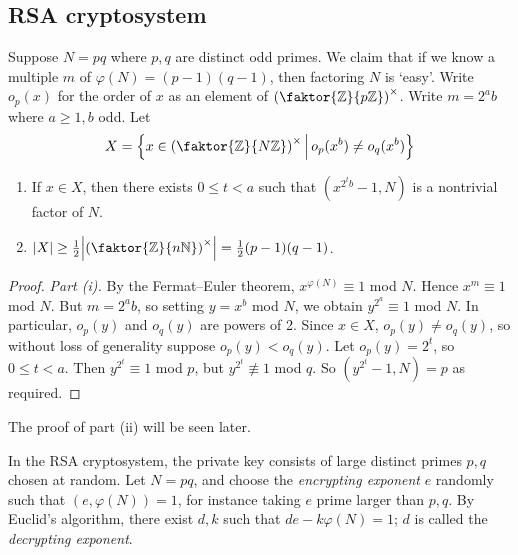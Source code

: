 \subsection{RSA cryptosystem}
Suppose \( N = pq \) where \( p, q \) are distinct odd primes.
We claim that if we know a multiple \( m \) of \( \varphi(N) = (p-1)(q-1) \), then factoring \( N \) is `easy'.
Write \( o_p(x) \) for the order of \( x \) as an element of \( \qty(\faktor{\mathbb Z}{p\mathbb Z})^\times \).
Write \( m = 2^a b \) where \( a \geq 1, b \) odd.
Let
\[ X = \qty{x \in \qty(\faktor{\mathbb Z}{N\mathbb Z})^\times \midd o_p(x^b) \neq o_q(x^b)} \]
\begin{theorem}
    \begin{enumerate}
        \item If \( x \in X \), then there exists \( 0 \leq t < a \) such that \( (x^{2^t b} - 1, N) \) is a nontrivial factor of \( N \).
        \item \( \abs{X} \geq \frac{1}{2} \abs{\qty(\faktor{\mathbb Z}{n\mathbb N})^\times} = \frac{1}{2}(p-1)(q-1) \).
    \end{enumerate}
\end{theorem}
\begin{proof}
    \emph{Part (i).}
    By the Fermat--Euler theorem, \( x^{\varphi(N)} \equiv 1 \) mod \( N \).
    Hence \( x^m \equiv 1 \) mod \( N \).
    But \( m = 2^a b \), so setting \( y = x^b \) mod \( N \), we obtain \( y^{2^a} \equiv 1 \) mod \( N \).
    In particular, \( o_p(y) \) and \( o_q(y) \) are powers of 2.
    Since \( x \in X \), \( o_p(y) \neq o_q(y) \), so without loss of generality suppose \( o_p(y) < o_q(y) \).
    Let \( o_p(y) = 2^t \), so \( 0 \leq t < a \).
    Then \( y^{2^t} \equiv 1 \) mod \( p \), but \( y^{2^t} \not\equiv 1 \) mod \( q \).
    So \( (y^{2^t} - 1, N) = p \) as required.
\end{proof}
The proof of part (ii) will be seen later.

In the RSA cryptosystem, the private key consists of large distinct primes \( p, q \) chosen at random.
Let \( N = pq \), and choose the \emph{encrypting exponent} \( e \) randomly such that \( (e, \varphi(N)) = 1 \), for instance taking \( e \) prime larger than \( p, q \).
By Euclid's algorithm, there exist \( d, k \) such that \( de - k\varphi(N) = 1 \); \( d \) is called the \emph{decrypting exponent}.

